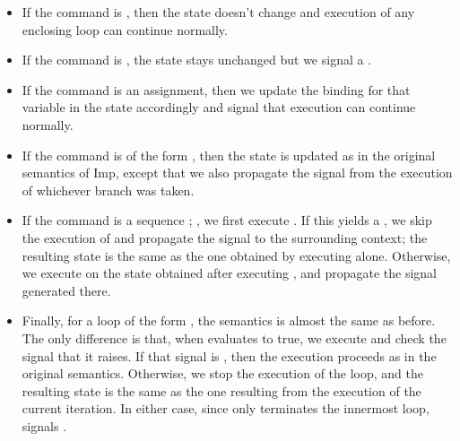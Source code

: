 \documentclass[12pt]{report}
\begin{document}
\begin{itemize}
\item  If the command is , then the state doesn't change and
      execution of any enclosing loop can continue normally.



\item  If the command is , the state stays unchanged but we
      signal a .



\item  If the command is an assignment, then we update the binding for
      that variable in the state accordingly and signal that execution
      can continue normally.



\item  If the command is of the form       , then
      the state is updated as in the original semantics of Imp, except
      that we also propagate the signal from the execution of
      whichever branch was taken.



\item  If the command is a sequence  ; , we first execute
      .  If this yields a , we skip the execution of 
      and propagate the  signal to the surrounding context;
      the resulting state is the same as the one obtained by
      executing  alone. Otherwise, we execute  on the state
      obtained after executing , and propagate the signal
      generated there.



\item  Finally, for a loop of the form     , the
      semantics is almost the same as before. The only difference is
      that, when  evaluates to true, we execute  and check the
      signal that it raises.  If that signal is , then the
      execution proceeds as in the original semantics. Otherwise, we
      stop the execution of the loop, and the resulting state is the
      same as the one resulting from the execution of the current
      iteration.  In either case, since  only terminates the
      innermost loop,  signals . 
\end{itemize}
\end{document}

